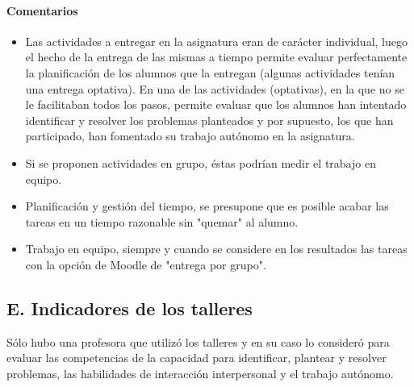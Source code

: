 \paragraph*{Comentarios}

\begin{itemize}
\item Las actividades a entregar en la asignatura eran de carácter individual, luego el hecho de la entrega de las mismas a tiempo permite evaluar perfectamente la planificación de los alumnos que la entregan (algunas actividades tenían una entrega optativa). En una de las actividades (optativas), en la que no se le facilitaban todos los pasos, permite evaluar que los alumnos han intentado identificar y resolver los problemas planteados y por supuesto, los que han participado, han fomentado su trabajo autónomo en la asignatura.
\item Si se proponen actividades en grupo, éstas podrían medir el trabajo en equipo.
\item Planificación y gestión del tiempo, se presupone que es posible acabar las tareas en un tiempo razonable sin "quemar" al alumno.
\item Trabajo en equipo, siempre y cuando se considere en los resultados las tareas con la opción de Moodle de "entrega por grupo". 
\end{itemize}

	\subsection*{E. Indicadores de los talleres}

Sólo hubo una profesora que utilizó los talleres y en su caso lo consideró para evaluar las competencias de la capacidad para  identificar, plantear y resolver problemas, las habilidades de interacción interpersonal y el trabajo autónomo.
